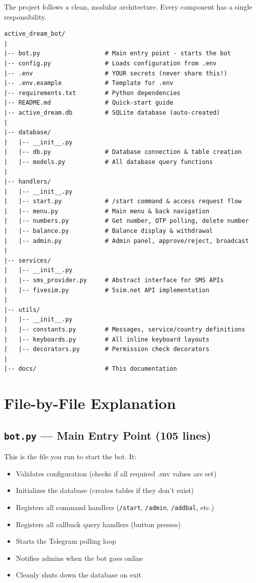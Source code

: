 The project follows a clean, modular architecture. Every component has a single responsibility.

\begin{lstlisting}[style=bashstyle, title=Project Directory Tree]
active_dream_bot/
|
|-- bot.py                  # Main entry point - starts the bot
|-- config.py               # Loads configuration from .env
|-- .env                    # YOUR secrets (never share this!)
|-- .env.example            # Template for .env
|-- requirements.txt        # Python dependencies
|-- README.md               # Quick-start guide
|-- active_dream.db         # SQLite database (auto-created)
|
|-- database/
|   |-- __init__.py
|   |-- db.py               # Database connection & table creation
|   |-- models.py           # All database query functions
|
|-- handlers/
|   |-- __init__.py
|   |-- start.py            # /start command & access request flow
|   |-- menu.py             # Main menu & back navigation
|   |-- numbers.py          # Get number, OTP polling, delete number
|   |-- balance.py          # Balance display & withdrawal
|   |-- admin.py            # Admin panel, approve/reject, broadcast
|
|-- services/
|   |-- __init__.py
|   |-- sms_provider.py     # Abstract interface for SMS APIs
|   |-- fivesim.py          # 5sim.net API implementation
|
|-- utils/
|   |-- __init__.py
|   |-- constants.py        # Messages, service/country definitions
|   |-- keyboards.py        # All inline keyboard layouts
|   |-- decorators.py       # Permission check decorators
|
|-- docs/                   # This documentation
\end{lstlisting}

\section{File-by-File Explanation}

\subsection{\texttt{bot.py} --- Main Entry Point (105 lines)}

This is the file you run to start the bot. It:
\begin{itemize}
    \item Validates configuration (checks if all required .env values are set)
    \item Initializes the database (creates tables if they don't exist)
    \item Registers all command handlers (\texttt{/start}, \texttt{/admin}, \texttt{/addbal}, etc.)
    \item Registers all callback query handlers (button presses)
    \item Starts the Telegram polling loop
    \item Notifies admins when the bot goes online
    \item Cleanly shuts down the database on exit
\end{itemize}

